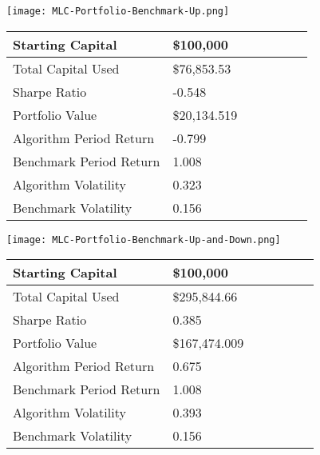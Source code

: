 \begin{center}  
    \texttt{[image: MLC-Portfolio-Benchmark-Up.png]}
    \label{fig:nonfloat}
\end{center}

\begin{center}
    \begin{tabular}{ | l | l | l | | l | l | l | p{5cm} |}
    \hline
    Starting Capital & \$100,000 \\ \hline
    Total Capital Used & \$76,853.53 \\ \hline
    Sharpe Ratio & -0.548 \\ \hline
    Portfolio Value & \$20,134.519 \\ \hline
    Algorithm Period Return & -0.799 \\ \hline
    Benchmark Period Return & 1.008 \\ \hline
    Algorithm Volatility & 0.323 \\ \hline
    Benchmark Volatility & 0.156 \\
    \hline
    \end{tabular}
    \label{table:nonfloat}
\end{center}

\begin{center}  
    \texttt{[image: MLC-Portfolio-Benchmark-Up-and-Down.png]}
    \label{fig:nonfloat}
\end{center}

\begin{center}
    \begin{tabular}{ | l | l | l | | l | l | l | p{5cm} |}
    \hline
    Starting Capital & \$100,000 \\ \hline
    Total Capital Used & \$295,844.66 \\ \hline
    Sharpe Ratio & 0.385 \\ \hline
    Portfolio Value & \$167,474.009 \\ \hline
    Algorithm Period Return & 0.675 \\ \hline
    Benchmark Period Return & 1.008 \\ \hline
    Algorithm Volatility & 0.393 \\ \hline
    Benchmark Volatility & 0.156 \\
    \hline
    \end{tabular}
    \label{table:nonfloat}
\end{center}

